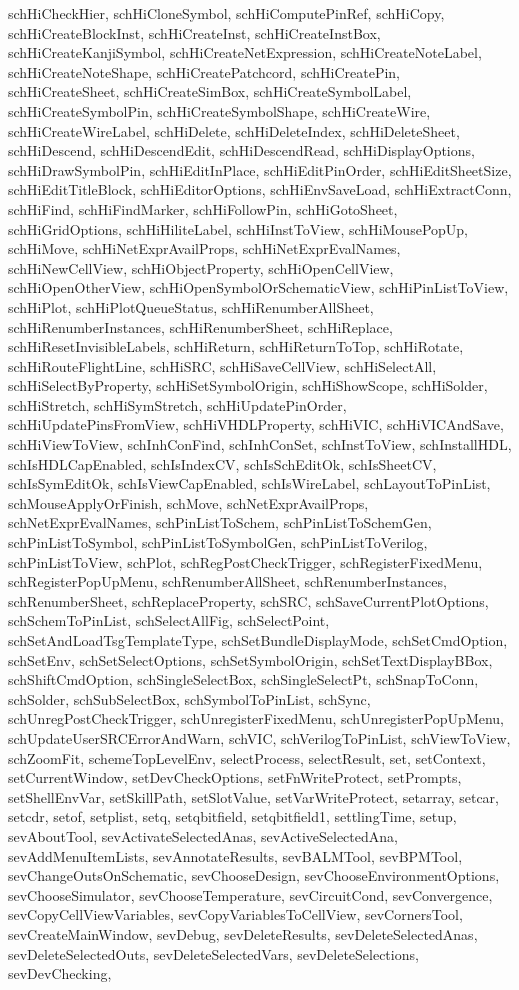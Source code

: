 {{schHiCheckHier, schHiCloneSymbol, schHiComputePinRef, schHiCopy, schHiCreateBlockInst, schHiCreateInst, schHiCreateInstBox, schHiCreateKanjiSymbol, schHiCreateNetExpression, schHiCreateNoteLabel, schHiCreateNoteShape, schHiCreatePatchcord, schHiCreatePin, schHiCreateSheet, schHiCreateSimBox, schHiCreateSymbolLabel, schHiCreateSymbolPin, schHiCreateSymbolShape, schHiCreateWire, schHiCreateWireLabel, schHiDelete, schHiDeleteIndex, schHiDeleteSheet, schHiDescend, schHiDescendEdit, schHiDescendRead, schHiDisplayOptions, schHiDrawSymbolPin, schHiEditInPlace, schHiEditPinOrder, schHiEditSheetSize, schHiEditTitleBlock, schHiEditorOptions, schHiEnvSaveLoad, schHiExtractConn, schHiFind, schHiFindMarker, schHiFollowPin, schHiGotoSheet, schHiGridOptions, schHiHiliteLabel, schHiInstToView, schHiMousePopUp, schHiMove, schHiNetExprAvailProps, schHiNetExprEvalNames, schHiNewCellView, schHiObjectProperty, schHiOpenCellView, schHiOpenOtherView, schHiOpenSymbolOrSchematicView, schHiPinListToView, schHiPlot, schHiPlotQueueStatus, schHiRenumberAllSheet, schHiRenumberInstances, schHiRenumberSheet, schHiReplace, schHiResetInvisibleLabels, schHiReturn, schHiReturnToTop, schHiRotate, schHiRouteFlightLine, schHiSRC, schHiSaveCellView, schHiSelectAll, schHiSelectByProperty, schHiSetSymbolOrigin, schHiShowScope, schHiSolder, schHiStretch, schHiSymStretch, schHiUpdatePinOrder, schHiUpdatePinsFromView, schHiVHDLProperty, schHiVIC, schHiVICAndSave, schHiViewToView, schInhConFind, schInhConSet, schInstToView, schInstallHDL, schIsHDLCapEnabled, schIsIndexCV, schIsSchEditOk, schIsSheetCV, schIsSymEditOk, schIsViewCapEnabled, schIsWireLabel, schLayoutToPinList, schMouseApplyOrFinish, schMove, schNetExprAvailProps, schNetExprEvalNames, schPinListToSchem, schPinListToSchemGen, schPinListToSymbol, schPinListToSymbolGen, schPinListToVerilog, schPinListToView, schPlot, schRegPostCheckTrigger, schRegisterFixedMenu, schRegisterPopUpMenu, schRenumberAllSheet, schRenumberInstances, schRenumberSheet, schReplaceProperty, schSRC, schSaveCurrentPlotOptions, schSchemToPinList, schSelectAllFig, schSelectPoint, schSetAndLoadTsgTemplateType, schSetBundleDisplayMode, schSetCmdOption, schSetEnv, schSetSelectOptions, schSetSymbolOrigin, schSetTextDisplayBBox, schShiftCmdOption, schSingleSelectBox, schSingleSelectPt, schSnapToConn, schSolder, schSubSelectBox, schSymbolToPinList, schSync, schUnregPostCheckTrigger, schUnregisterFixedMenu, schUnregisterPopUpMenu, schUpdateUserSRCErrorAndWarn, schVIC, schVerilogToPinList, schViewToView, schZoomFit, schemeTopLevelEnv, selectProcess, selectResult, set, setContext, setCurrentWindow, setDevCheckOptions, setFnWriteProtect, setPrompts, setShellEnvVar, setSkillPath, setSlotValue, setVarWriteProtect, setarray, setcar, setcdr, setof, setplist, setq, setqbitfield, setqbitfield1, settlingTime, setup, sevAboutTool, sevActivateSelectedAnas, sevActiveSelectedAna, sevAddMenuItemLists, sevAnnotateResults, sevBALMTool, sevBPMTool, sevChangeOutsOnSchematic, sevChooseDesign, sevChooseEnvironmentOptions, sevChooseSimulator, sevChooseTemperature, sevCircuitCond, sevConvergence, sevCopyCellViewVariables, sevCopyVariablesToCellView, sevCornersTool, sevCreateMainWindow, sevDebug, sevDeleteResults, sevDeleteSelectedAnas, sevDeleteSelectedOuts, sevDeleteSelectedVars, sevDeleteSelections, sevDevChecking, }}
